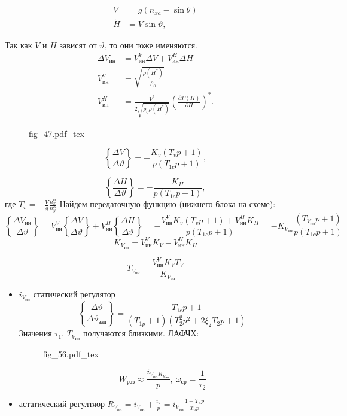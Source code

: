\documentclass{article}
\newcommand{\incfig}[1]{
    {#1.pdf_tex}
}
\begin{document}
\begin{align*}
    \dot{V} & = g(n_{xa} - \sin{\theta}) \\ 
    \dot{H} & = V \sin{\vartheta} ,
\end{align*}

Так как $V$ и $H$ зависят от $\vartheta$, то они тоже именяются.
\begin{align*}
    \Delta V_{ин} &= V_{ин}^V \Delta V + V_{ин}^H \Delta H \\
    V_{ин}^V &= \sqrt{\frac{\rho(H^*)}{\rho_0}} \\
     V_{ин}^H &= \frac{V^*}{2 \sqrt{\rho_0 \rho(H^*)}} \left( \frac{\partial P(H)}{\partial H} \right)^*.
\end{align*}

\begin{figure}[H]
    \centering
    \incfig{fig_47}
    \label{fig:fig_47}
\end{figure}

\[
    \left\{ \frac{\Delta V}{\Delta \vartheta} \right\} = - \frac{K_v(T_v p + 1)}{p(T_{1c} p + 1)},
\]

\[
    \left\{ \frac{\Delta H}{\Delta \vartheta} \right\} = - \frac{K_H}{p(T_{1c} p + 1)},
\]
где $T_v = -\frac{V}{g} \frac{n_x^\alpha}{ n_y^\alpha}$
Найдем передаточную функцию (нижнего блока на схеме):
\[
    \left\{ \frac{\Delta V_{ин}}{\Delta \vartheta} \right\} = V_{ин}^V \left\{ \frac{\Delta V}{\Delta \vartheta} \right\} + V_{ин}^H \left\{ \frac{\Delta H }{\Delta \vartheta} \right\} = - \frac{ V_{ин}^V K_v (T_v p + 1) + V_{ин}^H K_H}{p(T_{1c} p + 1)} = -K_{ V_{ин}} \frac{(T_{ V_{ин}} p + 1)}{p (T_{1c} p +1)}
\]
\[
    K_{ V_{ин}} = V_{ин}^V K_V  - V_{ин}^H K_H
\]

\[
    T_{ V_{ин}}  =\frac{ V_{ин}^V K_V T_V}{ K_{ V_{ин}}}
\]
\begin{itemize}
    \item  $i_{ V_{ин}}$ статический регулятор
        \[
            \left\{ \frac{\Delta \vartheta}{\Delta \vartheta_{зад}} \right\} = \frac{T_{1c}p + 1}{ (T_{1p} + 1)( T_2^2 p^2 + 2 \xi_2 T_2p + 1) }
        \]
        Значения $\tau_1$, $T_{ V_{ин}}$ получаются близкими.
        ЛАФЧХ:
        \begin{figure}[H]
            \centering
            \incfig{fig_56}
            \label{fig:fig_56}
        \end{figure}
        \[
            W_{раз} \approx \frac{i_{ V_{ин}K_{ V_{ин} }}}{p}, \ \omega_{ср} = \frac{1}{\tau_2}
        \]
        \item астатический регултяор $R_{ V_{ин}} = i_{ V_{ин}} + \frac{ i_u}{p} = i_{ V_{ин} } \frac{1 + T_u p }{T_u p}$
\end{itemize}    
\end{document}

